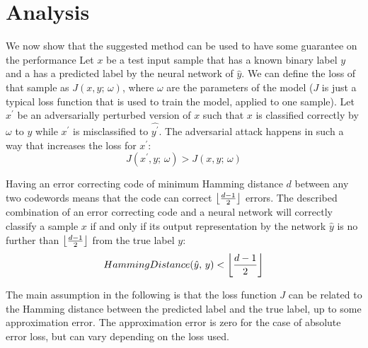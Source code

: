\documentclass{article}
\DeclarePairedDelimiter\floor{\lfloor}{\rfloor}
\begin{document}

\section{Analysis}
We now show that the suggested method can be used to have some guarantee on the performance 
Let $x$ be a test input sample that has a known binary label $y$ and a has a predicted label by the neural network of $\hat{y}$. We can define the loss of that sample as $J(x, y; \, \omega)$, where $\omega$ are the parameters of the model ($J$ is just a typical loss function that is used to train the model, applied to one sample). Let $x^\prime$ be an adversarially perturbed version of $x$ such that $x$ is classified correctly by $\omega$ to $y$ while $x^\prime$ is misclassified to $\hat{y^\prime}$. The adversarial attack happens in such a way that increases the loss for $x^\prime$: \[ J(x^\prime, y; \, \omega) > J(x, y; \, \omega) \]

Having an error correcting code of minimum Hamming distance $d$ between any two codewords means that the code can correct $\floor*{\frac{d-1}{2}}$ errors. The described combination of an error correcting code and a neural network will correctly classify a sample $x$ if and only if its output representation by the network $\hat{y}$ is no further than $\floor*{\frac{d-1}{2}}$ from the true label $y$: \[ HammingDistance(\hat{y}, \, y) < \floor*{\frac{d-1}{2}} \]

The main assumption in the following is that the loss function $J$ can be related to the Hamming distance between the predicted label and the true label, up to some approximation error. The approximation error is zero for the case of absolute error loss, but can vary depending on the loss used. 

\end{document}

